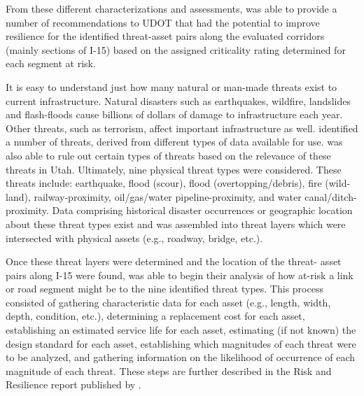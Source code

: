 From these different characterizations and assessments,
\citeauthor{aem2017} was able to provide a number of recommendations to UDOT that had the
potential to improve
resilience for the identified threat-asset pairs along the evaluated corridors (mainly sections of I-15)
based on the assigned criticality rating determined for each segment at risk.

It is easy to understand just how many natural or man-made threats exist to
current infrastructure. Natural disasters such as earthquakes, wildfire,
landslides and flash-floods cause billions of dollars of damage to infrastructure each year.
Other threats, such as terrorism, affect important infrastructure as well.
\citeauthor{aem2017} identified a number of threats, derived
from different types of data available for use. \citeauthor{aem2017} was
also able to rule out certain types of threats based on the relevance of these
threats in Utah. Ultimately, nine physical threat types were considered. These threats
include: earthquake, flood (scour), flood
(overtopping/debris), fire
(wild-land), railway-proximity, oil/gas/water pipeline-proximity, and water
canal/ditch-proximity. Data comprising historical disaster occurrences or
geographic location about these threat types exist and was assembled into
threat layers which were intersected with physical assets (e.g., roadway,
bridge, etc.).

Once these threat layers were determined and the location of the threat-
asset pairs along I-15
were found, \citeauthor{aem2017} was able to begin their analysis of how at-risk a link or road
segment might be to the nine identified threat types. This process consisted of
gathering characteristic
data for each asset (e.g., length, width, depth, condition, etc.), determining a
replacement cost for
each asset, establishing an estimated service life for each asset,
estimating (if not known) the
design standard for each asset, establishing which magnitudes of each
threat were to be analyzed,
and gathering information on the likelihood of occurrence of each
magnitude of each threat. These
steps are further described in the Risk and Resilience report published by \citet{aem2017}.

